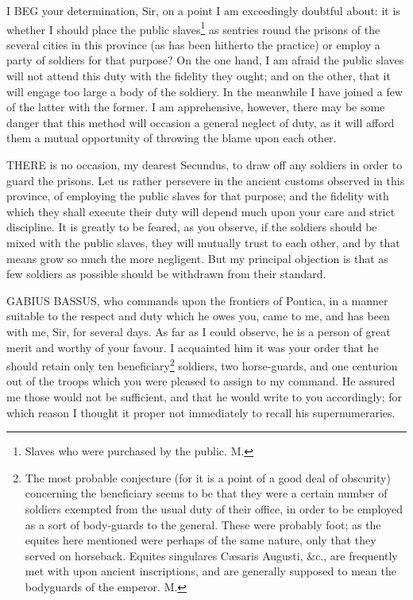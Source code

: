 I BEG your determination, Sir, on a point I am exceedingly doubtful about:
it is whether I should place the public slaves\footnote{Slaves who were
purchased by the public. M.} as sentries round
the prisons of the several cities in this province (as has been hitherto
the practice) or employ a party of soldiers for that purpose? On the one
hand, I am afraid the public slaves will not attend this duty with the
fidelity they ought; and on the other, that it will engage too large a
body of the soldiery. In the meanwhile I have joined a few of the latter
with the former. I am apprehensive, however, there may be some danger that
this method will occasion a general neglect of duty, as it will afford
them a mutual opportunity of throwing the blame upon each other.


THERE is no occasion, my dearest Secundus, to draw off any soldiers in
order to guard the prisons. Let us rather persevere in the ancient customs
observed in this province, of employing the public slaves for that
purpose; and the fidelity with which they shall execute their duty will
depend much upon your care and strict discipline. It is greatly to be
feared, as you observe, if the soldiers should be mixed with the public
slaves, they will mutually trust to each other, and by that means grow so
much the more negligent. But my principal objection is that as few
soldiers as possible should be withdrawn from their standard.


GABIUS BASSUS, who commands upon the frontiers of Pontica, in a manner
suitable to the respect and duty which he owes you, came to me, and has
been with me, Sir, for several days. As far as I could observe, he is a
person of great merit and worthy of your favour. I acquainted him it was
your order that he should retain only ten beneficiary\footnote{The most probable
conjecture (for it is a point of a good deal of obscurity) concerning the
beneficiary seems to be that they were a certain number of soldiers
exempted from the usual duty of their office, in order to be employed as a
sort of body-guards to the general. These were probably foot; as the
equites here mentioned were perhaps of the same nature, only that they
served on horseback. Equites singulares Cæsaris Augusti, \&c., are
frequently met with upon ancient inscriptions, and are generally supposed
to mean the bodyguards of the emperor. M.}
soldiers, two horse-guards, and one centurion out of the troops which you
were pleased to assign to my command. He assured me those would not be
sufficient, and that he would write to you accordingly; for which reason I
thought it proper not immediately to recall his supernumeraries.

